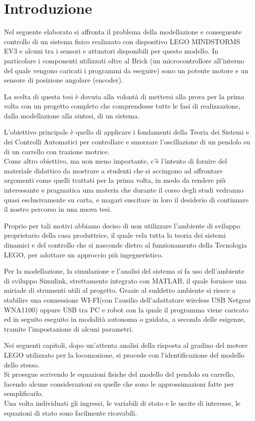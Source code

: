 \chapter{Introduzione}
Nel seguente elaborato si affronta il problema della modellazione e conseguente controllo di un sistema fisico realizzato con dispositivo LEGO MINDSTORMS EV3 e alcuni tra i sensori e attuatori disponibili per questo modello.
In particolare i componenti utilizzati oltre al Brick (un microcontrollore all'interno del quale vengono caricati i programmi da eseguire) sono un potente motore e un sensore di posizione angolare (encoder).

La scelta di questa tesi è dovuta alla volontà di mettersi alla prova per la prima volta con un progetto completo che comprendesse tutte le fasi di realizzazione, dalla modellazione alla sintesi, di un sistema.

L'obiettivo principale è quello di applicare i fondamenti della Teoria dei Sistemi e dei Controlli Automatici per controllare e smorzare l'oscillazione di un pendolo su di un carrello con trazione motrice.\\

Come altro obiettivo, ma non meno importante, c'è l'intento di fornire del materiale didattico da mostrare a studenti che si accingono ad affrontare argomenti come quelli trattati per la prima volta, in modo da rendere più interessante e pragmatica una materia che durante il corso degli studi vedranno quasi esclusivamente su carta, e magari suscitare in loro il desiderio di continuare il nostro percorso in una nuova tesi. 

Proprio per tali motivi abbiamo deciso di non utilizzare l'ambiente di sviluppo proprietario della casa produttrice, il quale vela tutta la teoria dei sistemi dinamici e del controllo che si nasconde dietro al funzionamento della Tecnologia LEGO, per adottare un approccio più ingegneristico.

Per la modellazione, la simulazione e l'analisi del sistema si fa uso dell'ambiente di sviluppo Simulink, strettamente integrato con MATLAB, il quale fornisce una miriade di strumenti utili al progetto.
Grazie al suddetto ambiente si riesce a stabilire una connessione WI-FI(con l'ausilio dell'adattatore wireless USB Netgear WNA1100) oppure USB tra PC e robot con la quale il programma viene caricato ed in seguito eseguito in modalità autonoma o guidata, a seconda delle esigenze, tramite l'impostazione di alcuni parametri.

Nei seguenti capitoli, dopo un'attenta analisi della risposta al gradino del motore LEGO utilizzato per la locomozione, si procede con l'identificazione del modello dello stesso.\\
Si prosegue scrivendo le equazioni fisiche del modello del pendolo su carrello, facendo alcune considerazioni su quelle che sono le approssimazioni fatte per semplificarlo.\\
Una volta individuati gli ingressi, le variabili di stato e le uscite di interesse, le equazioni di stato sono facilmente ricavabili.

